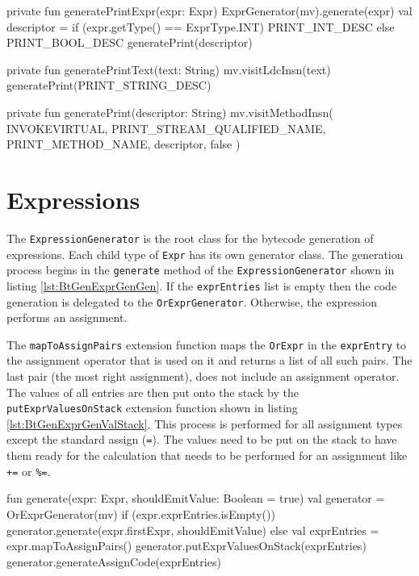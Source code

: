 \begin{KotlinCode}[float,numbers=none,caption=Code for the print generation methods of the \texttt{OutputStatGenerator}., label=lst:BtGenOutputStatGen]
private fun generatePrintExpr(expr: Expr) {
    ExprGenerator(mv).generate(expr)
    val descriptor = if (expr.getType() == ExprType.INT) {
        PRINT_INT_DESC
    }else {
        PRINT_BOOL_DESC
    }
    generatePrint(descriptor)
}

private fun generatePrintText(text: String) {
    mv.visitLdcInsn(text)
    generatePrint(PRINT_STRING_DESC)
}

private fun generatePrint(descriptor: String) {
    mv.visitMethodInsn(
        INVOKEVIRTUAL,
        PRINT_STREAM_QUALIFIED_NAME,
        PRINT_METHOD_NAME,
        descriptor,
        false
    )
}
\end{KotlinCode}


\section{Expressions}

The \verb|ExpressionGenerator| is the root class for the bytecode generation of expressions. Each child type of \verb|Expr| has its own generator class. The generation process begins in the \verb|generate| method of the \verb|ExpressionGenerator| shown in listing \ref{lst:BtGenExprGenGen}. If the \verb|exprEntries| list is empty then the code generation is delegated to the \verb|OrExprGenerator|. Otherwise, the expression performs an assignment. 

The \verb|mapToAssignPairs| extension function maps the \verb|OrExpr| in the \verb|exprEntry| to the assignment operator that is used on it and returns a list of all such pairs. The last pair (the most right assignment), does not include an assignment operator. The values of all entries are then put onto the stack by the \verb|putExprValuesOnStack| extension function shown in listing \ref{lst:BtGenExprGenValStack}. This process is performed for all assignment types except the standard assign (\verb|=|). The values need to be put on the stack to have them ready for the calculation that needs to be performed for an assignment like \verb|+=| or \verb|%=|.


\begin{KotlinCode}[float,numbers=none,caption=Implementation of the \texttt{generate} method of the \texttt{ExpressionGenerator}., label=lst:BtGenExprGenGen]
fun generate(expr: Expr, shouldEmitValue: Boolean = true) {
    val generator = OrExprGenerator(mv)
    if (expr.exprEntries.isEmpty()) {
        generator.generate(expr.firstExpr, shouldEmitValue)
    } else {
        val exprEntries = expr.mapToAssignPairs()
        generator.putExprValuesOnStack(exprEntries)
        generator.generateAssignCode(exprEntries)
    }
}  
\end{KotlinCode}

